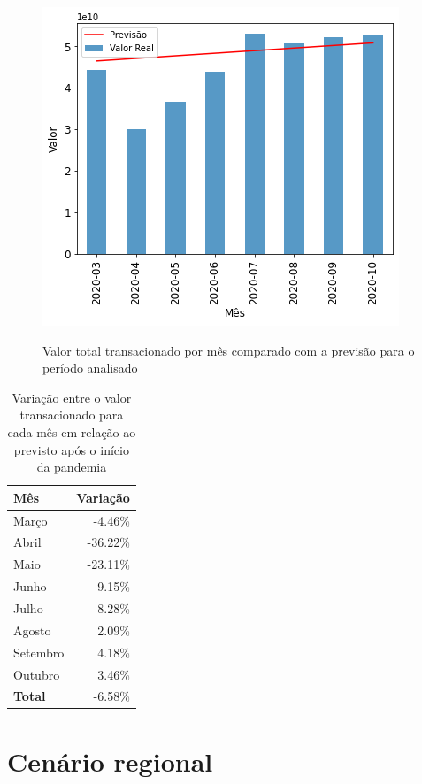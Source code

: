 \begin{figure}[htb]
	\centering
    \caption{Valor total transacionado por mês comparado com a previsão para o período analisado}
    \includegraphics[scale=0.7]{images/base-de-dados-18.2-valor-total-vs-previsao.png}
    \label{fig:pandemia:descritiva-18.2-valor-total-vs-previsao}
    \fdadospesquisa
\end{figure}

\begin{table}[htb]
\centering
\caption{Variação entre o valor transacionado para cada mês em relação ao previsto após o início da pandemia}
\label{tab:pandemia:valor-total-vs-previsao}
\begin{tabular}{lr}
\toprule
Mês & Variação \\
\midrule
Março &     -4.46\% \\
Abril &    -36.22\% \\
Maio &     -23.11\% \\
Junho &     -9.15\% \\
Julho &      8.28\% \\
Agosto &     2.09\% \\
Setembro &   4.18\% \\
Outubro &    3.46\% \\ \hline
\textbf{Total} & -6.58\% \\
\bottomrule
\end{tabular}
\fdadospesquisa
\end{table}

\section{Cenário regional}


